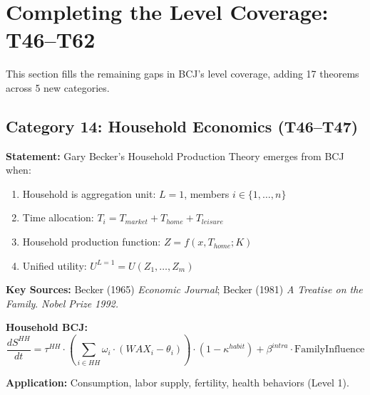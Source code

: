 
\section{Completing the Level Coverage: T46--T62}
\label{sec:bcj-level-completion}

This section fills the remaining gaps in BCJ's level coverage, adding 17 theorems across 5 new categories.

\subsection{Category 14: Household Economics (T46--T47)}

\begin{tcolorbox}[colback=brown!5!white, colframe=brown!75!black,
    title=Theorem BCJ-T46: Becker Household Production as Special Case]
\textbf{Statement:} Gary Becker's Household Production Theory emerges from BCJ when:
\begin{enumerate}[nosep]
\item Household is aggregation unit: $L=1$, members $i \in \{1, \ldots, n\}$
\item Time allocation: $T_i = T_{market} + T_{home} + T_{leisure}$
\item Household production function: $Z = f(x, T_{home}; K)$
\item Unified utility: $U^{L=1} = U(Z_1, \ldots, Z_m)$
\end{enumerate}

\textbf{Key Sources:} Becker (1965) \textit{Economic Journal}; Becker (1981) \textit{A Treatise on the Family}. \textit{Nobel Prize 1992.}

\textbf{Household BCJ:}
\begin{equation}
\frac{dS^{HH}}{dt} = \tau^{HH} \cdot \left(\sum_{i \in HH} \omega_i \cdot (WAX_i - \theta_i)\right) \cdot (1-\kappa^{habit}) + \beta^{intra} \cdot \text{FamilyInfluence}
\end{equation}

\textbf{Application:} Consumption, labor supply, fertility, health behaviors (Level 1).
\end{tcolorbox}

